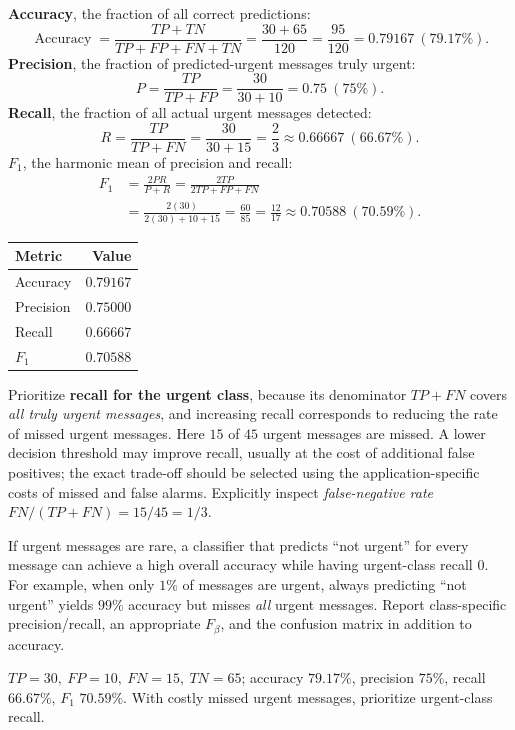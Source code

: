 \textbf{Accuracy}, the fraction of all correct predictions:
\[
\operatorname{Accuracy}=\frac{TP+TN}{TP+FP+FN+TN}
=\frac{30+65}{120}=\frac{95}{120}=\boxed{0.79167\ (79.17\%)}.
\]
\textbf{Precision}, the fraction of predicted-urgent messages truly urgent:
\[
P=\frac{TP}{TP+FP}=\frac{30}{30+10}=\boxed{0.75\ (75\%)}.
\]
\textbf{Recall}, the fraction of all actual urgent messages detected:
\[
R=\frac{TP}{TP+FN}=\frac{30}{30+15}
=\boxed{\frac{2}{3}\approx0.66667\ (66.67\%)}.
\]
\textbf{$F_1$}, the harmonic mean of precision and recall:
\begin{align*}
F_1&=\frac{2PR}{P+R}
=\frac{2TP}{2TP+FP+FN}\\
&=\frac{2(30)}{2(30)+10+15}
=\frac{60}{85}=\boxed{\frac{12}{17}\approx0.70588\ (70.59\%)}.
\end{align*}
\begin{center}\begin{tabular}{@{}lr@{}}\toprule Metric&Value\\\midrule Accuracy&$0.79167$\\ Precision&$0.75000$\\ Recall&$0.66667$\\ $F_1$&$0.70588$\\\bottomrule\end{tabular}\end{center}

Prioritize \textbf{recall for the urgent class}, because its denominator $TP+FN$ covers \emph{all truly urgent messages}, and increasing recall corresponds to reducing the rate of missed urgent messages. Here $15$ of $45$ urgent messages are missed. A lower decision threshold may improve recall, usually at the cost of additional false positives; the exact trade-off should be selected using the application-specific costs of missed and false alarms. Explicitly inspect \emph{false-negative rate} $FN/(TP+FN)=15/45=1/3$.

If urgent messages are rare, a classifier that predicts ``not urgent'' for every message can achieve a high overall accuracy while having urgent-class recall $0$. For example, when only $1\%$ of messages are urgent, always predicting ``not urgent'' yields $99\%$ accuracy but misses \emph{all} urgent messages. Report class-specific precision/recall, an appropriate $F_\beta$, and the confusion matrix in addition to accuracy.
\begin{answer}
$\boxed{TP=30,\ FP=10,\ FN=15,\ TN=65}$; accuracy $79.17\%$, precision $75\%$, recall $66.67\%$, $F_1$ $70.59\%$. With costly missed urgent messages, prioritize urgent-class recall.
\end{answer}
